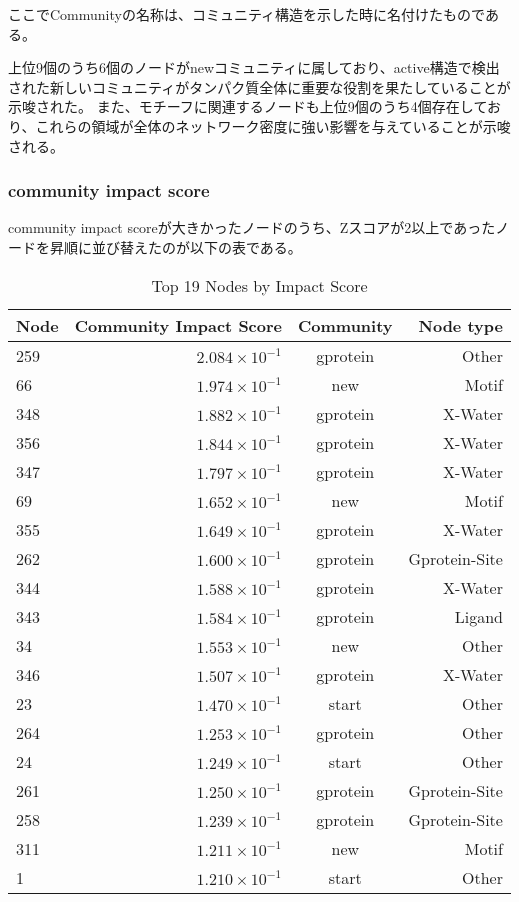 \newpage

ここでCommunityの名称は、コミュニティ構造を示した時に名付けたものである。

上位9個のうち6個のノードがnewコミュニティに属しており、active構造で検出された新しいコミュニティがタンパク質全体に重要な役割を果たしていることが示唆された。
また、モチーフに関連するノードも上位9個のうち4個存在しており、これらの領域が全体のネットワーク密度に強い影響を与えていることが示唆される。

\subsubsection{community impact score}
community impact scoreが大きかったノードのうち、Zスコアが2以上であったノードを昇順に並び替えたのが以下の表である。
\begin{table}[ht]
    \centering
    \begin{tabular}{|l|r|c|r|}
    \hline
    \textbf{Node} & \textbf{Community Impact Score} & \textbf{Community} & \textbf{Node type}\\
    \hline
    259 & \( 2.084 \times 10^{-1} \) & gprotein & Other \\
    66 & \( 1.974 \times 10^{-1} \) & new & Motif \\
    348 & \( 1.882 \times 10^{-1} \) & gprotein & X-Water \\
    356 & \( 1.844 \times 10^{-1} \) & gprotein & X-Water \\
    347 & \( 1.797 \times 10^{-1} \) & gprotein & X-Water \\
    69 & \( 1.652 \times 10^{-1} \) & new & Motif \\
    355 & \( 1.649 \times 10^{-1} \) & gprotein & X-Water \\
    262 & \( 1.600 \times 10^{-1} \) & gprotein & Gprotein-Site \\
    344 & \( 1.588 \times 10^{-1} \) & gprotein & X-Water \\
    343 & \( 1.584 \times 10^{-1} \) & gprotein & Ligand \\
    34 & \( 1.553 \times 10^{-1} \) & new & Other \\
    346 & \( 1.507 \times 10^{-1} \) & gprotein & X-Water \\
    23 & \( 1.470 \times 10^{-1} \) & start & Other \\
    264 & \( 1.253 \times 10^{-1} \) & gprotein & Other \\
    24 & \( 1.249 \times 10^{-1} \) & start & Other \\
    261 & \( 1.250 \times 10^{-1} \) & gprotein & Gprotein-Site \\
    258 & \( 1.239 \times 10^{-1} \) & gprotein & Gprotein-Site \\
    311 & \( 1.211 \times 10^{-1} \) & new & Motif \\
    1 & \( 1.210 \times 10^{-1} \) & start & Other \\
    \hline
    \end{tabular}
    \caption{Top 19 Nodes by Impact Score}
\end{table}
  
